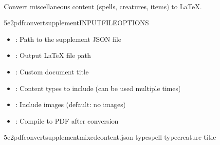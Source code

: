 \documentclass[letterpaper,10pt,english]{sphinxmanual}
\begin{document}
\paragraph{}
\label{\detokenize{user-guide/cli-reference:supplement}}
\sphinxAtStartPar
Convert miscellaneous content (spells, creatures, items) to LaTeX.

\begin{sphinxVerbatim}[commandchars=\\\{\}]
5e2pdfconvertsupplementINPUT\PYGZus{}FILE\PYG{o}{[}OPTIONS\PYG{o}{]}
\end{sphinxVerbatim}

\sphinxAtStartPar
{}
\begin{itemize}
\item {} 
\sphinxAtStartPar
{}: Path to the supplement JSON file

\end{itemize}

\sphinxAtStartPar
{}
\begin{itemize}
\item {} 
\sphinxAtStartPar
{}: Output LaTeX file path

\item {} 
\sphinxAtStartPar
{}: Custom document title

\item {} 
\sphinxAtStartPar
{}: Content types to include (can be used multiple times)

\item {} 
\sphinxAtStartPar
{}: Include images (default: no images)

\item {} 
\sphinxAtStartPar
{}: Compile to PDF after conversion

\end{itemize}

\sphinxAtStartPar
{}

\begin{sphinxVerbatim}[commandchars=\\\{\}]
5e2pdfconvertsupplementmixed\PYGZhy{}content.json
\PYGZhy{}\PYGZhy{}typespell
\PYGZhy{}\PYGZhy{}typecreature
\PYGZhy{}\PYGZhy{}title
\end{sphinxVerbatim}
\end{document}
